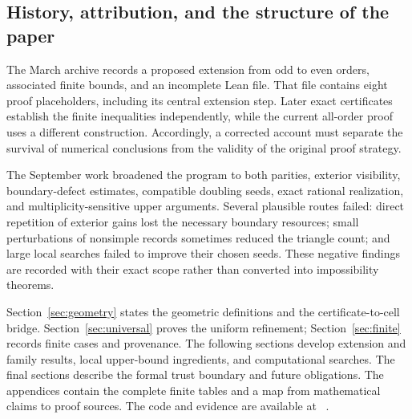 \subsection{History, attribution, and the structure of the paper}

The March archive records a proposed extension from odd to even orders, associated finite bounds, and an incomplete Lean file. That file contains eight proof placeholders, including its central extension step. Later exact certificates establish the finite inequalities independently, while the current all-order proof uses a different construction. Accordingly, a corrected account must separate the survival of numerical conclusions from the validity of the original proof strategy.

The September work broadened the program to both parities, exterior visibility, boundary-defect estimates, compatible doubling seeds, exact rational realization, and multiplicity-sensitive upper arguments. Several plausible routes failed: direct repetition of exterior gains lost the necessary boundary resources; small perturbations of nonsimple records sometimes reduced the triangle count; and large local searches failed to improve their chosen seeds. These negative findings are recorded with their exact scope rather than converted into impossibility theorems.

Section~\ref{sec:geometry} states the geometric definitions and the certificate-to-cell bridge. Section~\ref{sec:universal} proves the uniform refinement; Section~\ref{sec:finite} records finite cases and provenance. The following sections develop extension and family results, local upper-bound ingredients, and computational searches. The final sections describe the formal trust boundary and future obligations. The appendices contain the complete finite tables and a map from mathematical claims to proof sources. The code and evidence are available at \repo~\cite{zarzueloRepository}.

